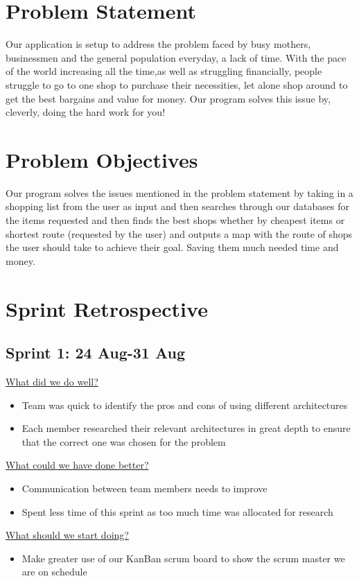 \documentclass[12pt]{article}
\begin{document}
\section{Problem Statement}
Our application is setup to address the problem faced by  busy mothers, businessmen and the general population everyday, a lack of time. With the pace of the world increasing all the time,as well as struggling financially, people struggle to go to one shop to purchase their necessities, let alone shop around to get the best bargains and value for money. Our program solves this issue by, cleverly, doing the hard work for you!    

\section{Problem Objectives}
Our program solves the issues mentioned in the problem statement by taking in a shopping list from the user as input and then searches through our databases for the items requested and then finds the best shops whether by cheapest items or shortest route (requested by the user) and outputs a map with the route of shops the user should take to achieve their goal. Saving them much needed time and money.


\section{Sprint Retrospective}
\subsection{Sprint 1: 24 Aug-31 Aug}
\underline{What did we do well?}
\begin{itemize}
\item Team was quick to identify the pros and cons of using different architectures
\item Each member researched their relevant architectures in great depth to ensure that the correct one was chosen for the problem 
\end{itemize}
\underline{What could we have done better?}
\begin{itemize}
\item Communication between team members needs to improve 
\item Spent less time of this sprint as too much time was allocated for research 
\end{itemize}
\underline{What should we start doing?}
\begin{itemize}
\item Make greater use of our KanBan scrum board to show the scrum master we are on schedule
\end{itemize}
\end{document}
